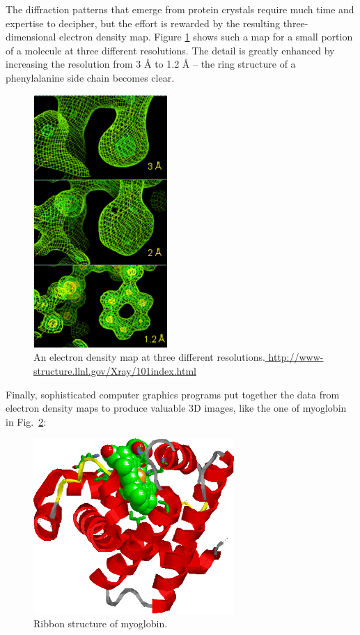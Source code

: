 The diffraction patterns that emerge from protein crystals require much time and expertise to decipher, but the effort is rewarded by the resulting three-dimensional electron density map.  Figure \ref{Fig9-6} shows such a map for a small portion of a molecule at three different resolutions.  The detail is greatly enhanced by increasing the resolution from 3 $\text{\AA}$ to 1.2 $\text{\AA}$ -- the ring structure of a phenylalanine side chain becomes clear.
\begin{figure}[h]
	\centering
	\includegraphics[width=2.0in]{./figures/Topic9/Fig9-6.png}
	\caption{ An electron density map at three different resolutions.\href{ http://www-structure.llnl.gov/Xray/101index.html}{ http://www-structure.llnl.gov/Xray/101index.html}}
 	\label{Fig9-6}
\end{figure}
Finally, sophisticated computer graphics programs put together the data from electron density maps to produce valuable 3D images, like the one of myoglobin in Fig.~\ref{Fig9-7}:
\begin{figure}[h]
	\centering
	\includegraphics[width=3.0in]{./figures/Topic9/Fig9-7.png}
	\caption{ Ribbon structure of myoglobin.}
 	\label{Fig9-7}
\end{figure}

